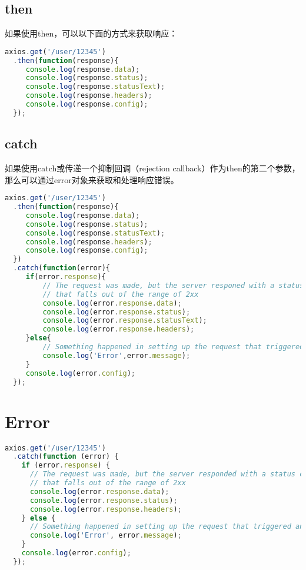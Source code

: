 \section{then}

如果使用then，可以以下面的方式来获取响应：

\begin{lstlisting}[language=JavaScript]
axios.get('/user/12345')
  .then(function(response){
     console.log(response.data);
     console.log(response.status);
     console.log(response.statusText);
     console.log(response.headers);
     console.log(response.config);
  });
\end{lstlisting}




\section{catch}

如果使用catch或传递一个抑制回调（rejection callback）作为then的第二个参数，那么可以通过error对象来获取和处理响应错误。

\begin{lstlisting}[language=JavaScript]
axios.get('/user/12345')
  .then(function(response){
     console.log(response.data);
     console.log(response.status);
     console.log(response.statusText);
     console.log(response.headers);
     console.log(response.config);
  })
  .catch(function(error){
     if(error.response){
         // The request was made, but the server responed with a status code
         // that falls out of the range of 2xx
         console.log(error.response.data);
         console.log(error.response.status);
         console.log(error.response.statusText);
         console.log(error.response.headers);
     }else{
         // Something happened in setting up the request that triggered an error
         console.log('Error',error.message);
     }
     console.log(error.config);
  });
\end{lstlisting}


\chapter{Error}



\begin{lstlisting}[language=JavaScript]
axios.get('/user/12345')
  .catch(function (error) {
    if (error.response) {
      // The request was made, but the server responded with a status code
      // that falls out of the range of 2xx
      console.log(error.response.data);
      console.log(error.response.status);
      console.log(error.response.headers);
    } else {
      // Something happened in setting up the request that triggered an Error
      console.log('Error', error.message);
    }
    console.log(error.config);
  });
\end{lstlisting}

